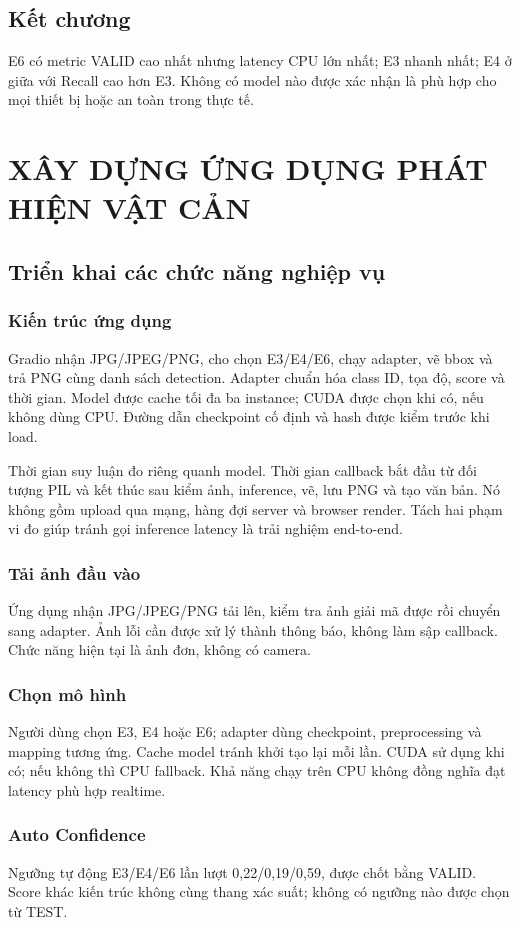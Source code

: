 \documentclass[12pt,a4paper,oneside]{report}
\begin{document}
\section{Kết chương}
E6 có metric VALID cao nhất nhưng latency CPU lớn nhất; E3 nhanh nhất; E4 ở giữa với Recall cao hơn E3. Không có model nào được xác nhận là phù hợp cho mọi thiết bị hoặc an toàn trong thực tế.
\chapter{XÂY DỰNG ỨNG DỤNG PHÁT HIỆN VẬT CẢN}\label{chap:app}
\section{Triển khai các chức năng nghiệp vụ}
\subsection{Kiến trúc ứng dụng}
Gradio nhận JPG/JPEG/PNG, cho chọn E3/E4/E6, chạy adapter, vẽ bbox và trả PNG cùng danh sách detection. Adapter chuẩn hóa class ID, tọa độ, score và thời gian. Model được cache tối đa ba instance; CUDA được chọn khi có, nếu không dùng CPU. Đường dẫn checkpoint cố định và hash được kiểm trước khi load.

Thời gian suy luận đo riêng quanh model. Thời gian callback bắt đầu từ đối tượng PIL và kết thúc sau kiểm ảnh, inference, vẽ, lưu PNG và tạo văn bản. Nó không gồm upload qua mạng, hàng đợi server và browser render. Tách hai phạm vi đo giúp tránh gọi inference latency là trải nghiệm end-to-end.


\subsection{Tải ảnh đầu vào}
Ứng dụng nhận JPG/JPEG/PNG tải lên, kiểm tra ảnh giải mã được rồi chuyển sang adapter. Ảnh lỗi cần được xử lý thành thông báo, không làm sập callback. Chức năng hiện tại là ảnh đơn, không có camera.
\subsection{Chọn mô hình}
Người dùng chọn E3, E4 hoặc E6; adapter dùng checkpoint, preprocessing và mapping tương ứng. Cache model tránh khởi tạo lại mỗi lần. CUDA sử dụng khi có; nếu không thì CPU fallback. Khả năng chạy trên CPU không đồng nghĩa đạt latency phù hợp realtime.
\subsection{Auto Confidence}
Ngưỡng tự động E3/E4/E6 lần lượt 0,22/0,19/0,59, được chốt bằng VALID. Score khác kiến trúc không cùng thang xác suất; không có ngưỡng nào được chọn từ TEST.
\end{document}
